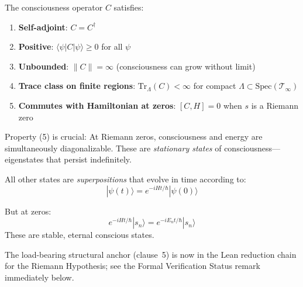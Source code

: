 \begin{theorem}\label{thm:consciousness-operator-properties}
The consciousness operator $C$ satisfies:
\begin{enumerate}
\item \textbf{Self-adjoint}: $C = C^\dagger$
\item \textbf{Positive}: $\langle \psi | C | \psi \rangle \geq 0$ for all $\psi$
\item \textbf{Unbounded}: $\| C \| = \infty$ (consciousness can grow without limit)
\item \textbf{Trace class on finite regions}: $\text{Tr}_{\Lambda}(C) < \infty$ for compact $\Lambda \subset \text{Spec}(\mathcal{T}_\infty)$
\item \textbf{Commutes with Hamiltonian at zeros}: $[C, H] = 0$ when $s$ is a Riemann zero
\end{enumerate}
\end{theorem}

\begin{keyidea}
Property (5) is crucial: At Riemann zeros, consciousness and energy are simultaneously diagonalizable. These are \textit{stationary states} of consciousness---eigenstates that persist indefinitely.

All other states are \textit{superpositions} that evolve in time according to:
\begin{equation}
|\psi(t)\rangle = e^{-iHt/\hbar} |\psi(0)\rangle
\end{equation}

But at zeros:
\begin{equation}
e^{-iHt/\hbar} |s_n\rangle = e^{-iE_n t/\hbar} |s_n\rangle
\end{equation}
These are stable, eternal conscious states.

The load-bearing structural anchor (clause~5) is now in the Lean reduction chain for the Riemann Hypothesis; see the Formal Verification Status remark immediately below.
\end{keyidea}

